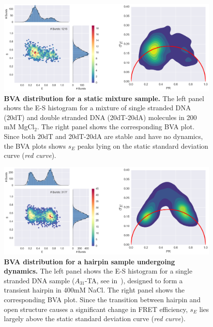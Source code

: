 \documentclass[10pt,letterpaper]{article}
\begin{document}
\begin{figure}[h!]
\begin{center}
\includegraphics[width=0.98\columnwidth]{figures/ALEX_BVA_static/ALEX_BVA_static}
\caption{\label{fig:bva_static}  \textbf{BVA distribution for a static mixture sample.}
The left panel shows the E-S histogram for a mixture of single stranded DNA (20dT) and double stranded DNA (20dT-20dA) molecules in  200 mM MgCl$_2$. The right panel shows the corresponding BVA plot. Since both 20dT and 20dT-20dA are stable and have no dynamics, the BVA plots shows $s_E$ peaks lying on the static standard deviation curve (\textit{red curve}).%
}
\end{center}
\end{figure}

\begin{figure}[h!]
\begin{center}
\includegraphics[width=0.98\columnwidth]{figures/ALEX_BVA_dynamic/ALEX_BVA_dynamic}
\caption{\label{fig:bva_dynamic} \textbf{BVA distribution for a hairpin sample undergoing dynamics.}
The left panel shows the E-S histogram for a single stranded DNA sample ($A_{31}$-TA, see in~\cite{Tsukanov_2013}), designed to form a transient hairpin in 400mM NaCl. The right panel shows the corresponding BVA plot. Since the transition between hairpin and open structure causes a significant change in FRET efficiency, $s_E$ lies largely above the static standard deviation curve (\textit{red curve}).%
}
\end{center}
\end{figure}
\end{document}
